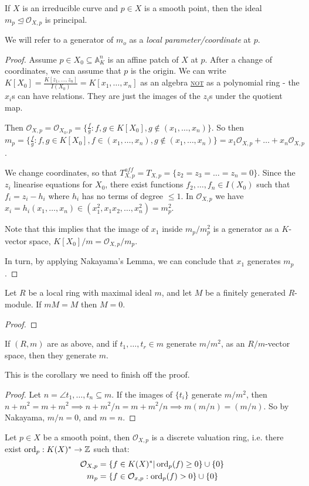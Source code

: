 \documentclass[10pt,a4paper,rgb]{article}
\newcommand{\A}{\mathbb{A}}
\begin{document}
\begin{theorem}
If $X$ is an irreducible curve and $p \in X$ is a smooth point, then the ideal $m_p \trianglelefteq \mathcal{O}_{X,p}$ is principal.
\end{theorem}
We will refer to a generator of $m_o$ as a \emph{local parameter/coordinate} at $p$.
\begin{proof}
Assume $p \in X_0 \subseteq \A_K^n$ is an affine patch of $X$ at $p$. After a change of coordinates, we can assume that $p$ is the origin. We can write $K[X_0] = \frac{K[z_1, \ldots, z_n]}{I(X_0)} = K[x_1, \ldots, x_n]$ as an algebra \underline{\textsc{not}} as a polynomial ring - the $x_i$s can have relations. They are just the images of the $z_i$s under the quotient map.

Then $\mathcal{O}_{X,p} = \mathcal{O}_{X_0,p} = \{\frac{f}{g} : f,g \in K[X_0], g \notin (x_1, \ldots, x_n)\}$. So then $m_p = \{\frac{f}{g} : f,g \in K[X_0], f \in (x_1, \ldots, x_n), g \notin (x_1, \ldots , x_n)\} = x_1\mathcal{O}_{X,p} + \ldots + x_n\mathcal{O}_{X,p}$.

We change coordinates, so that $T_{X,p}^{aff} = T_{X,p} = \{z_2 = z_3 = \ldots = z_n = 0\}$. Since the $z_i$ linearise equations for $X_0$, there exist functions $f_2, \ldots, f_n \in I(X_0)$ such that $f_i = z_i - h_i$ where $h_i$ has no terms of degree $\leq 1$. In $\mathcal{O}_{X,p}$ we have $x_i = h_i(x_1, \ldots, x_n) \in (x_1^2, x_1x_2, \ldots, x_n^2) = m_p^2$.

Note that this implies that the image of $x_1$ inside $m_p/{m_p^2}$ is a generator as a $K$-vector space, $K[X_0]/m = \mathcal{O}_{X,p}/{m_p}$.

In turn, by applying Nakayama's Lemma, we can conclude that $x_1$ generates $m_p$.
\end{proof}
\begin{lemma}
Let $R$ be a local ring with maximal ideal $m$, and let $M$ be a finitely generated $R$-module. If $mM = M$ then $M = 0$.
\end{lemma}
\begin{proof}
\google
\end{proof}
\begin{corollary}
If $(R,m)$ are as above, and if $t_1, \ldots, t_r \in m$ generate $m/m^2$, as an $R/{m}$-vector space, then they generate $m$.
\end{corollary}
This is the corollary we need to finish off the proof.
\begin{proof}
Let $n = \angle{t_1, \ldots, t_n} \subseteq m$. If the images of $\{t_i\}$ generate $m/{m^2}$, then $n+m^2 = m+m^2 \implies n+m^2/n = m+m^2/n \implies m(m/n) = (m/n)$. So by Nakayama, $m/n = 0$, and $m = n$.
\end{proof}

\begin{corollary}
Let $p \in X$ be a smooth point, then $\mathcal{O}_{X,p}$ is a discrete valuation ring, i.e. there exist $\operatorname{ord}_p : K(X)^\ast \to \mathbb{Z}$ such that:
\begin{align*}
\mathcal{O}_{X,p} &= \{f \in K(X)^\ast |\operatorname{ord}_p(f) \geq 0\} \cup \{0\}\\
m_p &= \{f \in \mathcal{O}_{x,p} : \operatorname{ord}_p(f) > 0\}\cup\{0\}
\end{align*}
\end{corollary}
\end{document}
